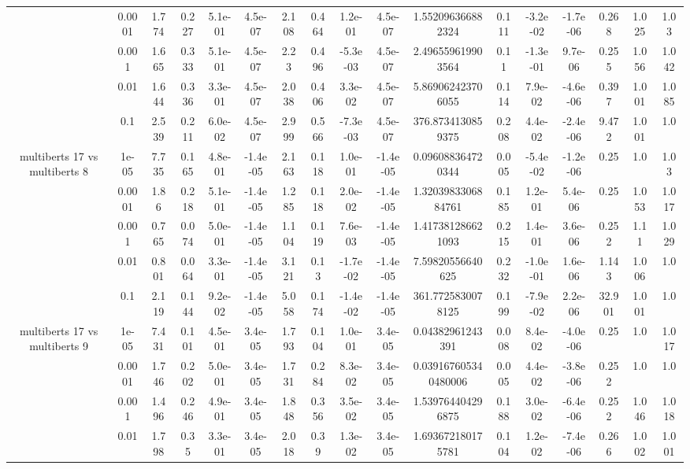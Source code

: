 \begin{tabular}{|c|c|c|c|c|c|c|c|c|c|c|c|c|c|c|c|c|}
 & 0.0001 & 1.774 & 0.227 & 5.1e-01 & 4.5e-07 & 2.108 & 0.464 & 1.2e-01 & 4.5e-07 & 1.552096366882324 & 0.111 & -3.2e-02 & -1.7e-06 & 0.268 & 1.025 & 1.03 \\
 & 0.001 & 1.665 & 0.333 & 5.1e-01 & 4.5e-07 & 2.23 & 0.496 & -5.3e-03 & 4.5e-07 & 2.496559619903564 & 0.11 & -1.3e-01 & 9.7e-06 & 0.255 & 1.056 & 1.042 \\
 & 0.01 & 1.644 & 0.336 & 3.3e-01 & 4.5e-07 & 2.038 & 0.406 & 3.3e-02 & 4.5e-07 & 5.869062423706055 & 0.114 & 7.9e-02 & -4.6e-06 & 0.397 & 1.001 & 1.085 \\
 & 0.1 & 2.539 & 0.211 & 6.0e-02 & 4.5e-07 & 2.999 & 0.566 & -7.3e-03 & 4.5e-07 & 376.8734130859375 & 0.208 & 4.4e-02 & -2.4e-06 & 9.472 & 1.001 & 1.0 \\
\hline
\multirow{5}{*}{multiberts 17 vs multiberts 8} & 1e-05 & 7.735 & 0.165 & 4.8e-01 & -1.4e-05 & 2.163 & 0.118 & 1.0e-01 & -1.4e-05 & 0.096088364720344 & 0.005 & -5.4e-02 & -1.2e-06 & 0.25 & 1.0 & 1.03 \\
 & 0.0001 & 1.86 & 0.218 & 5.1e-01 & -1.4e-05 & 1.285 & 0.118 & 2.0e-02 & -1.4e-05 & 1.3203983306884761 & 0.185 & 1.2e-01 & 5.4e-06 & 0.25 & 1.053 & 1.017 \\
 & 0.001 & 0.765 & 0.074 & 5.0e-01 & -1.4e-05 & 1.104 & 0.119 & 7.6e-03 & -1.4e-05 & 1.417381286621093 & 0.215 & 1.4e-01 & 3.6e-06 & 0.252 & 1.11 & 1.029 \\
 & 0.01 & 0.801 & 0.064 & 3.3e-01 & -1.4e-05 & 3.121 & 0.13 & -1.7e-02 & -1.4e-05 & 7.59820556640625 & 0.232 & -1.0e-01 & 1.6e-06 & 1.143 & 1.006 & 1.0 \\
 & 0.1 & 2.119 & 0.144 & 9.2e-02 & -1.4e-05 & 5.058 & 0.174 & -1.4e-02 & -1.4e-05 & 361.7725830078125 & 0.199 & -7.9e-02 & 2.2e-06 & 32.901 & 1.001 & 1.0 \\
\hline
\multirow{5}{*}{multiberts 17 vs multiberts 9} & 1e-05 & 7.431 & 0.101 & 4.5e-01 & 3.4e-05 & 1.793 & 0.104 & 1.0e-01 & 3.4e-05 & 0.04382961243391 & 0.008 & 8.4e-02 & -4.0e-06 & 0.25 & 1.0 & 1.017 \\
 & 0.0001 & 1.746 & 0.202 & 5.0e-01 & 3.4e-05 & 1.731 & 0.284 & 8.3e-02 & 3.4e-05 & 0.039167605340480006 & 0.005 & 4.4e-02 & -3.8e-06 & 0.252 & 1.0 & 1.0 \\
 & 0.001 & 1.496 & 0.246 & 4.9e-01 & 3.4e-05 & 1.848 & 0.356 & 3.5e-02 & 3.4e-05 & 1.539764404296875 & 0.188 & 3.0e-02 & -6.4e-06 & 0.252 & 1.046 & 1.018 \\
 & 0.01 & 1.798 & 0.35 & 3.3e-01 & 3.4e-05 & 2.018 & 0.39 & 1.3e-02 & 3.4e-05 & 1.693672180175781 & 0.104 & 1.2e-02 & -7.4e-06 & 0.266 & 1.002 & 1.001 \\

\end{tabular}
